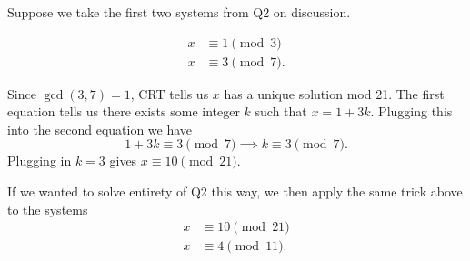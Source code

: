 \begin{example}
    Suppose we take the first two systems from Q2 on discussion. 

\begin{align*}
        x &\equiv 1\pmod{3} \\
        x &\equiv 3 \pmod{7}. 
    \end{align*}

    Since $\gcd(3,7) = 1$, CRT tells us $x$ has a unique solution mod 21. The first equation tells us there exists some integer $k$ such that $x = 1 + 3k$. Plugging this into the second equation we have \[ 1 + 3k \equiv 3 \pmod{7} \implies k \equiv 3 \pmod{7}. \] Plugging in $k = 3$ gives $x \equiv 10 \pmod{21}$. 

    \vspace{5mm}
    
    If we wanted to solve entirety of Q2 this way, we then apply the same trick above to the systems 
    \begin{align*}
        x &\equiv 10\pmod{21} \\
        x &\equiv 4 \pmod{11}. 
    \end{align*}
\end{example}